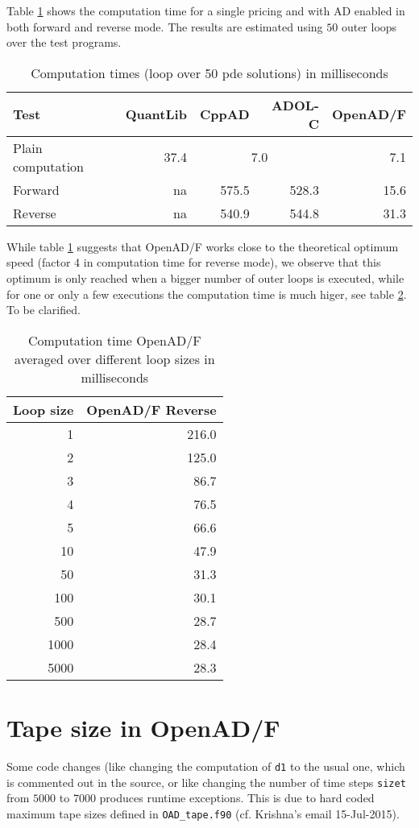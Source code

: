 \documentclass{amsart}
\theoremstyle{plain}
\numberwithin{equation}{section}
\begin{document}
Table \ref{computationTimes} shows the computation time for a single pricing and with AD enabled in both forward and reverse mode. The results are estimated using $50$ outer loops over the test programs.

\begin{table}[ht]
\caption{Computation times (loop over 50 pde solutions) in milliseconds}
\begin{tabular}{l | r | r | r | r}
Test & QuantLib & CppAD & ADOL-C & OpenAD/F \\ \hline
Plain computation & 37.4 & \multicolumn{2}{c|}{7.0} &  7.1 \\ \hline
Forward & na & 575.5 & 528.3 & 15.6 \\
Reverse & na & 540.9 & 544.8 & 31.3
\end{tabular}
\label{computationTimes}
\end{table}

While table \ref{computationTimes} suggests that OpenAD/F works close to the theoretical optimum speed (factor 4 in computation time for reverse mode), we observe that this optimum is only reached when a bigger number of outer loops is executed, while for one or only a few executions the computation time is much higer, see table \ref{loopsizes}. To be clarified.

\begin{table}[ht]
\caption{Computation time OpenAD/F averaged over different loop sizes in milliseconds}
\begin{tabular}{r | r}
Loop size & OpenAD/F Reverse \\ \hline
1 & 216.0 \\
2 & 125.0 \\
3 & 86.7 \\
4 & 76.5 \\
5 & 66.6 \\
10 & 47.9 \\
50 & 31.3 \\
100 & 30.1 \\
500 & 28.7 \\
1000 & 28.4 \\
5000 & 28.3
\end{tabular}
\label{loopsizes}
\end{table}

\section{Tape size in OpenAD/F}

Some code changes (like changing the computation of \verb+d1+ to the usual one, which is commented out in the source, or like changing the number of time steps \verb+sizet+ from $5000$ to $7000$ produces runtime exceptions. This is due to hard coded maximum tape sizes defined in \verb+OAD_tape.f90+ (cf. Krishna's email 15-Jul-2015).
\end{document}
